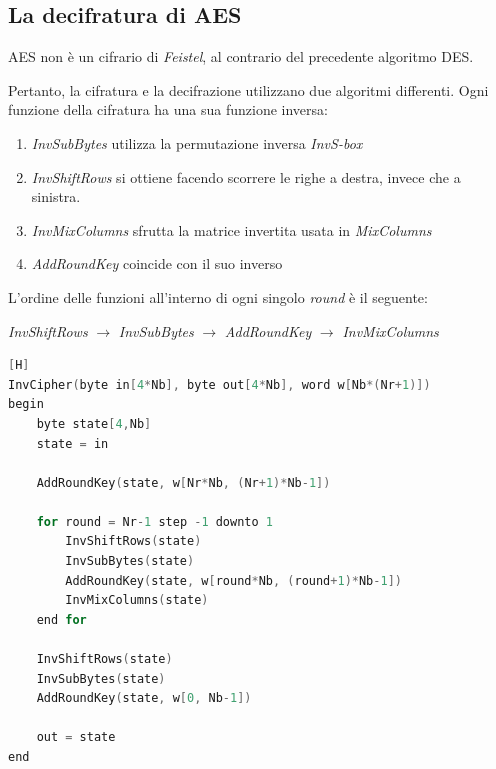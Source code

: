 \documentclass[a4paper,11pt]{article}
\begin{document}
\subsection{La decifratura di AES}
AES non è un cifrario di \textit{Feistel}, al contrario del precedente algoritmo DES.

Pertanto, la cifratura e la decifrazione utilizzano due algoritmi differenti.
\bigbreak
Ogni funzione della cifratura ha una sua funzione inversa:
\begin{enumerate}
    \item \textit{InvSubBytes} utilizza la permutazione inversa \textit{InvS-box}
    \item \textit{InvShiftRows} si ottiene facendo scorrere le righe a destra, invece che a sinistra.
    \item \textit{InvMixColumns} sfrutta la matrice invertita usata in \textit{MixColumns}
    \item \textit{AddRoundKey} coincide con il suo inverso
\end{enumerate}
\bigbreak\noindent
L'ordine delle funzioni all'interno di ogni singolo \textit{round} è il seguente:
\begin{center}
    \textit{InvShiftRows} $\rightarrow$ \textit{InvSubBytes} $\rightarrow$ \textit{AddRoundKey} $\rightarrow$ \textit{InvMixColumns}
\end{center}
\begin{lstlisting}[language=c, caption={Pseudo Code for the Inverse Cipher}, frame=single][H]
InvCipher(byte in[4*Nb], byte out[4*Nb], word w[Nb*(Nr+1)])
begin
    byte state[4,Nb]
    state = in

    AddRoundKey(state, w[Nr*Nb, (Nr+1)*Nb-1])
    
    for round = Nr-1 step -1 downto 1
        InvShiftRows(state)
        InvSubBytes(state)
        AddRoundKey(state, w[round*Nb, (round+1)*Nb-1])
        InvMixColumns(state)
    end for

    InvShiftRows(state)
    InvSubBytes(state)
    AddRoundKey(state, w[0, Nb-1])

    out = state
end
\end{lstlisting}
\end{document}
